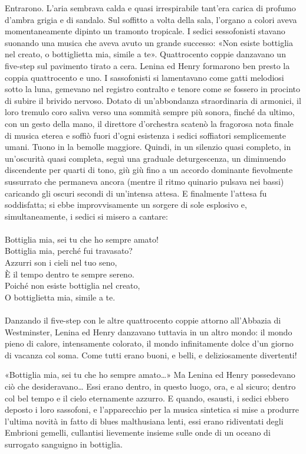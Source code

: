 \documentclass[
a5paper, %
10pt, %
twoside, 
onecolumn, %
openany, %
]{memoir}
\begin{document}
Entrarono. L’aria sembrava calda e quasi irrespirabile tant’era carica di profumo d’ambra grigia e di sandalo. Sul soffitto a volta della sala, l’organo a colori aveva momentaneamente dipinto un tramonto tropicale. I sedici sessofonisti stavano suonando una musica che aveva avuto un grande successo: «Non esiste bottiglia nel creato, o bottiglietta mia, simile a te». Quattrocento coppie danzavano un five-step sul pavimento tirato a cera. Lenina ed Henry formarono ben presto la coppia quattrocento e uno. I sassofonisti si lamentavano come gatti melodiosi sotto la luna, gemevano nel registro contralto e tenore come se fossero in procinto di subire il brivido nervoso. Dotato di un’abbondanza straordinaria di armonici, il loro tremulo coro saliva verso una sommità sempre più sonora, finché da ultimo, con un gesto della mano, il direttore d’orchestra scatenò la fragorosa nota finale di musica eterea e soffiò fuori d’ogni esistenza i sedici soffiatori semplicemente umani. Tuono in la bemolle maggiore. Quindi, in un silenzio quasi completo, in un’oscurità quasi completa, seguì una graduale deturgescenza, un diminuendo discendente per quarti di tono, giù giù fino a un accordo dominante fievolmente sussurrato che permaneva ancora (mentre il ritmo quinario pulsava nei bassi) caricando gli oscuri secondi di un’intensa attesa. E finalmente l’attesa fu soddisfatta; si ebbe improvvisamente un sorgere di sole esplosivo e, simultaneamente, i sedici si misero a cantare:
\leavevmode\\\leavevmode\\
{\tiny Bottiglia mia, sei tu che ho sempre amato!\\
Bottiglia mia, perché fui travasato?\\
Azzurri son i cieli nel tuo seno,\\
È il tempo dentro te sempre sereno.\\
Poiché non esiste bottiglia nel creato,\\
O bottiglietta mia, simile a te.}
\leavevmode\\\leavevmode\\
Danzando il five-step con le altre quattrocento coppie attorno all’Abbazia di Westminster, Lenina ed Henry danzavano tuttavia in un altro mondo: il mondo pieno di calore, intensamente colorato, il mondo infinitamente dolce d’un giorno di vacanza col soma. Come tutti erano buoni, e belli, e deliziosamente divertenti!

«Bottiglia mia, sei tu che ho sempre amato…» Ma Lenina ed Henry possedevano ciò che desideravano… Essi erano dentro, in questo luogo, ora, e al sicuro; dentro col bel tempo e il cielo eternamente azzurro. E quando, esausti, i sedici ebbero deposto i loro sassofoni, e l’apparecchio per la musica sintetica si mise a produrre l’ultima novità in fatto di blues malthusiana lenti, essi erano ridiventati degli Embrioni gemelli, cullantisi lievemente insieme sulle onde di un oceano di surrogato sanguigno in bottiglia.
\end{document}
